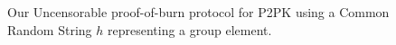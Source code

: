 \begin{figure}[t]
\begin{algorithm}[H]
    \caption{\label{alg.construction-crs} Our Uncensorable proof-of-burn protocol for P2PK using a Common Random String $h$ representing
    a group element.}
    \begin{algorithmic}[1]
            \State{}
        \EndFunction
            \State{}
        \EndFunction
        \vskip8pt
    \end{algorithmic}
\end{algorithm}
\end{figure}
